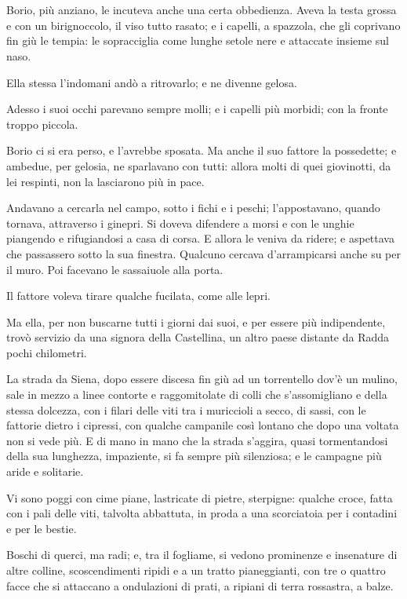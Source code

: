 \chapter{}

Borio, più anziano, le incuteva anche una certa obbedienza. Aveva la testa grossa e con un birignoccolo, il viso tutto rasato; e i capelli, a spazzola, che gli coprivano fin giù le tempia: le sopracciglia come lunghe setole nere e attaccate insieme sul naso.

Ella stessa l'indomani andò a ritrovarlo; e ne divenne gelosa.

Adesso i suoi occhi parevano sempre molli; e i capelli più morbidi; con la fronte troppo piccola.

Borio ci si era perso, e l’avrebbe sposata. Ma anche il suo fattore la possedette; e ambedue, per gelosia, ne sparlavano con tutti: allora molti di quei giovinotti, da lei respinti, non la lasciarono più in pace.

Andavano a cercarla nel campo, sotto i fichi e i peschi; l’appostavano, quando tornava, attraverso i ginepri. Si doveva difendere a morsi e con le unghie piangendo e rifugiandosi a casa di corsa. E allora le veniva da ridere; e aspettava che passassero sotto la sua finestra. Qualcuno cercava d’arrampicarsi anche su per il muro. Poi facevano le sassaiuole alla porta.

Il fattore voleva tirare qualche fucilata, come alle lepri.

Ma ella, per non buscarne tutti i giorni dai suoi, e per essere più indipendente, trovò servizio da una signora della Castellina, un altro paese distante da Radda pochi chilometri.

La strada da Siena, dopo essere discesa fin giù ad un torrentello dov’è un mulino, sale in mezzo a linee contorte e raggomitolate di colli che s’assomigliano e della stessa dolcezza, con i filari delle viti tra i muriccioli a secco, di sassi, con le fattorie dietro i cipressi, con qualche campanile così lontano che dopo una voltata non si vede più. E di mano in mano che la strada s’aggira, quasi tormentandosi della sua lunghezza, impaziente, si fa sempre più silenziosa; e le campagne più aride e solitarie.

Vi sono poggi con cime piane, lastricate di pietre, sterpigne: qualche croce, fatta con i pali delle viti, talvolta abbattuta, in proda a una scorciatoia per i contadini e per le bestie.

Boschi di querci, ma radi; e, tra il fogliame, si vedono prominenze e insenature di altre colline, scoscendimenti ripidi e a un tratto pianeggianti, con tre o quattro facce che si attaccano a ondulazioni di prati, a ripiani di terra rossastra, a balze.

